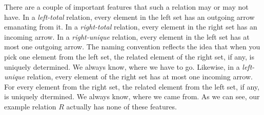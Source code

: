 \begin{figure}[h]
\centering
	
\end{figure}
There are a couple of important features that such a relation may or may not have. In a \emph{left-total} relation, every element in the left set has an outgoing arrow emanating from it. In a \emph{right-total} relation, every element in the right set has an incoming arrow. In a \emph{right-unique} relation, every element in the left set has at most one outgoing arrow. The naming convention reflects the idea that when you pick one element from the left set, the related  element of the right set, if any, is uniquely determined. We always know, where we have to go. Likewise, in a \emph{left-unique} relation, every element of the right set has at most one incoming arrow. For every element from the right set, the related element from the left set, if any, is uniquely dtermined. We always know, where we came from. As we can see, our example relation $R$ actually has none of these features.


